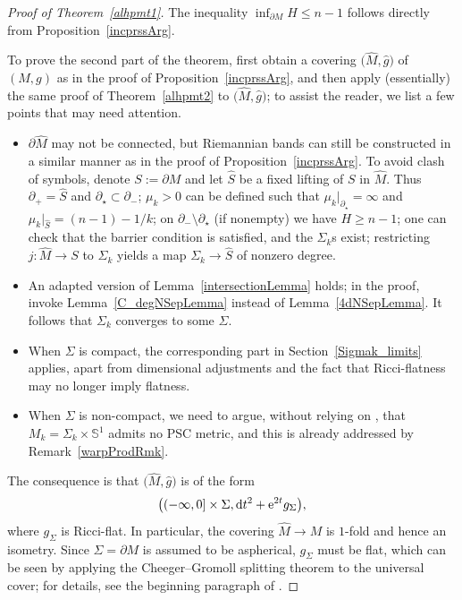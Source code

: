 \documentclass[10pt,a4paper]{amsart}
\numberwithin{equation}{section}
\def\S{\mathbb{S}}
\def\ed{{\rm d}}
\begin{document}
\begin{proof}[Proof of Theorem~\ref{alhpmt1}]
The inequality
$
	\inf_{\partial M}H \le n-1$
follows directly from Proposition~\ref{incprssArg}.

To prove the second part of the theorem, first obtain a covering $\bigl(\hat M, \hat g\bigr)$ of
$(M,g)$ as in the proof of Proposition~\ref{incprssArg}, and then apply (essentially)
the same proof of Theorem~\ref{alhpmt2} to $\big(\hat M,\hat g\big)$; to assist the reader,
we list a few points that may need attention.
\begin{itemize}\itemsep=0pt
	\item{$\partial \hat M$ may not be connected, but Riemannian bands can still be constructed in a similar manner as in
			the proof of Proposition~\ref{incprssArg}. To avoid clash of symbols, denote $S:=\partial M$ and let $\hat S$ be
			a fixed lifting of $S$ in $\hat M$. Thus $\partial_+ = \hat S$ and $\partial_\star\subset\partial_-$;
			$\mu_k >0$ can be defined such that $\mu_k|_{\partial_\star} = \infty$ and $\mu_k|_{\hat S} = (n-1) - 1/k$;
			on $\partial_-\setminus\partial_\star$ (if nonempty) we have $H \ge n-1$; one can check that
			the barrier condition is satisfied, and the $\Sigma_k$s exist; restricting $j\colon \hat M\rightarrow S$ to $\Sigma_k$
			yields a map $\Sigma_k\rightarrow\hat S$ of nonzero degree.}
	\item{An adapted version of Lemma~\ref{intersectionLemma} holds; in the proof, invoke Lemma~\ref{C_degNSepLemma}
	instead of Lemma~\ref{4dNSepLemma}. It follows that $\Sigma_k$ converges to some $\Sigma$.}		
	\item{When $\Sigma$ is compact, the corresponding part in Section~\ref{Sigmak_limits} applies, apart from dimensional adjustments
		and the fact that Ricci-flatness may no longer imply flatness.}
	\item{When $\Sigma$ is non-compact, we need to argue, without relying
	 on \cite[Corollary 1.10]{CRZ2022},  that $M_k = \Sigma_k\times\S^1$ admits no PSC metric, and this is already addressed by Remark~\ref{warpProdRmk}.}
\end{itemize}
The consequence is that
 $\big(\hat M, \hat g\big)$ is of the form
 \[
 	\bigl((-\infty, 0]\times \Sigma, \ed t^2+{\rm e}^{2t}g_\Sigma\bigr),
\]
where
  $g_\Sigma$ is Ricci-flat. In particular, the covering $\hat M\rightarrow M$ is $1$-fold and hence an isometry.
  Since $\Sigma = \partial M$ is assumed to be aspherical,
  $g_\Sigma$ must be flat, which can be seen by applying the Cheeger--Gromoll splitting theorem
  to the universal cover; for details, see the beginning paragraph of \cite[Section~6]{CL20}.
\end{proof}
\end{document}
